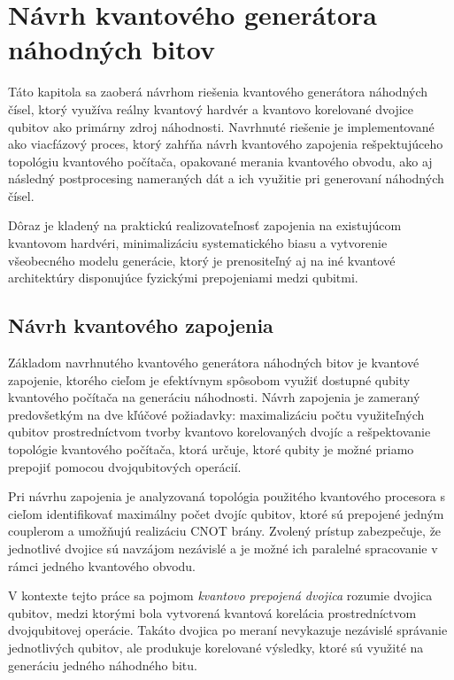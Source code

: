 \chapter{Návrh kvantového generátora náhodných bitov}

Táto kapitola sa zaoberá návrhom riešenia kvantového generátora náhodných čísel, ktorý využíva reálny kvantový hardvér a kvantovo korelované dvojice qubitov ako primárny zdroj náhodnosti.
Navrhnuté riešenie je implementované ako viacfázový proces, ktorý zahŕňa návrh kvantového zapojenia rešpektujúceho topológiu kvantového počítača, opakované merania kvantového obvodu, ako aj následný postprocesing nameraných dát a ich využitie pri generovaní náhodných čísel.

Dôraz je kladený na praktickú realizovateľnosť zapojenia na existujúcom kvantovom hardvéri, minimalizáciu systematického biasu a vytvorenie všeobecného modelu generácie, ktorý je prenositeľný aj na iné kvantové architektúry disponujúce fyzickými prepojeniami medzi qubitmi.

\section{Návrh kvantového zapojenia}

Základom navrhnutého kvantového generátora náhodných bitov je kvantové zapojenie, ktorého cieľom je efektívnym spôsobom využiť dostupné qubity kvantového počítača na generáciu náhodnosti.
Návrh zapojenia je zameraný predovšetkým na dve kľúčové požiadavky: maximalizáciu počtu využiteľných qubitov prostredníctvom tvorby kvantovo korelovaných dvojíc a rešpektovanie topológie kvantového počítača, ktorá určuje, ktoré qubity je možné priamo prepojiť pomocou dvojqubitových operácií.

Pri návrhu zapojenia je analyzovaná topológia použitého kvantového procesora s cieľom identifikovať maximálny počet dvojíc qubitov, ktoré sú prepojené jedným couplerom a umožňujú realizáciu CNOT brány.
Zvolený prístup zabezpečuje, že jednotlivé dvojice sú navzájom nezávislé a je možné ich paralelné spracovanie v rámci jedného kvantového obvodu.

V kontexte tejto práce sa pojmom \textit{kvantovo prepojená dvojica} rozumie dvojica qubitov, medzi ktorými bola vytvorená kvantová korelácia prostredníctvom dvojqubitovej operácie.
Takáto dvojica po meraní nevykazuje nezávislé správanie jednotlivých qubitov, ale produkuje korelované výsledky, ktoré sú využité na generáciu jedného náhodného bitu.

